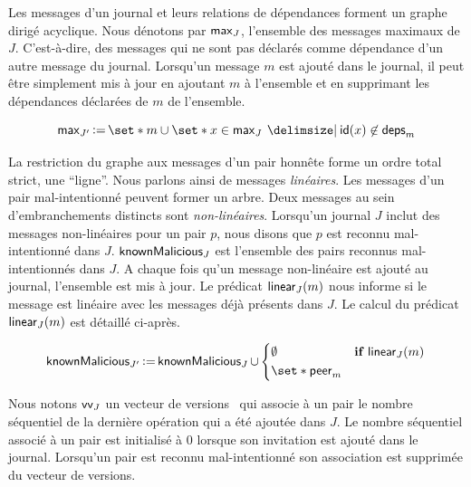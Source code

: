 Les messages d'un journal et leurs relations de dépendances forment un graphe dirigé acyclique.
Nous dénotons par $\operatorname{\mathsf{max}}_J$, l'ensemble des messages maximaux de $J$.
C'est-à-dire, des messages qui ne sont pas déclarés comme dépendance d'un autre message du journal.
Lorsqu'un message $m$ est ajouté dans le journal, il peut être simplement mis à jour en ajoutant $m$ à l'ensemble et en supprimant les dépendances déclarées de $m$ de l'ensemble.

\begin{equation*}
    \trm{max}_{J'} \assign \set*{m} \cup \set*{x \in \trm{max}_J \given \trm{id}(x) \not\in \trm{deps}_m}
\end{equation*}

La restriction du graphe aux messages d'un pair honnête forme un ordre total strict, une \enquote{ligne}.
Nous parlons ainsi de messages \emph{linéaires}.
Les messages d'un pair mal-intentionné peuvent former un arbre.
Deux messages au sein d'embranchements distincts sont \emph{non-linéaires}.
Lorsqu'un journal $J$ inclut des messages non-linéaires pour un pair $p$, nous disons que $p$ est reconnu mal-intentionné dans $J$.
$\operatorname{\mathsf{knownMalicious}}_J$ est l'ensemble des pairs reconnus mal-intentionnés dans $J$.
A chaque fois qu'un message non-linéaire est ajouté au journal, l'ensemble est mis à jour.
Le prédicat $\operatorname{\mathsf{linear}}_J(m)$ nous informe si le message est linéaire avec les messages déjà présents dans $J$.
Le calcul du prédicat $\operatorname{\mathsf{linear}}_J(m)$ est détaillé ci-après.

\begin{equation*}
    \trm{knownMalicious}_{J'} \assign \trm{knownMalicious}_J \cup \begin{dcases}
        \emptyset & \when \trm{linear}_J(m)\\
        \set*{\trm{peer}_m} &
    \end{dcases}
\end{equation*}

Nous notons $\operatorname{\mathsf{vv}}_J$ un vecteur de versions~\autocite{parker_1983_versionvector,mattern_1988_timevector} qui associe à un pair le nombre séquentiel de la dernière opération qui a été ajoutée dans $J$.
Le nombre séquentiel associé à un pair est initialisé à $0$ lorsque son invitation est ajouté dans le journal.
Lorsqu'un pair est reconnu mal-intentionné son association est supprimée du vecteur de versions.

